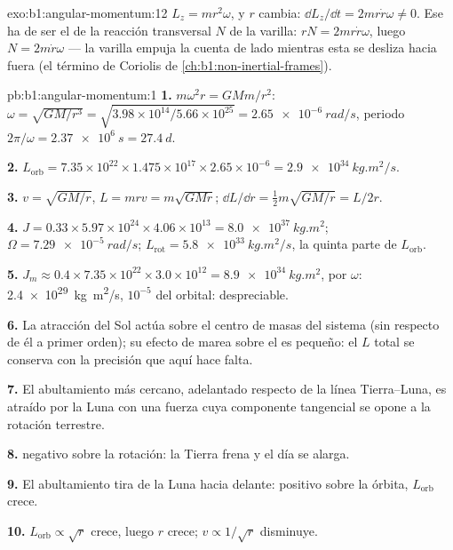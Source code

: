 \begin{solution}{exo:b1:angular-momentum:12}
$L_z = mr^2\omega$, y $r$ cambia: $\dd L_z/\dd t = 2mr\dot r\omega \neq 0$.
Ese ha de ser el  de la reacción transversal $N$ de la varilla: $rN =
2mr\dot r\omega$, luego $N = 2m\dot r\omega$ --- la varilla empuja la cuenta
de lado mientras esta se desliza hacia fuera (el término de Coriolis de
\cref{ch:b1:non-inertial-frames}).
\end{solution}

\begin{solution}{pb:b1:angular-momentum:1}
\textbf{1.} $m\omega^2r = GMm/r^2$: $\omega = \sqrt{GM/r^3} = \sqrt{3.98\times
10^{14}/5.66\times10^{25}} = \qty{2.65e-6}{rad/s}$, periodo $2\pi/\omega =
\qty{2.37e6}{s} = \qty{27.4}{d}$.

\textbf{2.} $L_{\text{orb}} = 7.35\times10^{22} \times 1.475\times10^{17}
\times 2.65\times10^{-6} = \qty{2.9e34}{kg.m^2/s}$.

\textbf{3.} $v = \sqrt{GM/r}$, $L = mrv = m\sqrt{GMr}$; $\dd L/\dd r =
\tfrac12 m\sqrt{GM/r} = L/2r$.

\textbf{4.} $J = 0.33 \times 5.97\times10^{24} \times 4.06\times10^{13} =
\qty{8.0e37}{kg.m^2}$; $\Omega = \qty{7.29e-5}{rad/s}$; $L_{\text{rot}} =
\qty{5.8e33}{kg.m^2/s}$, la quinta parte de $L_{\text{orb}}$.

\textbf{5.} $J_m \approx 0.4 \times 7.35\times10^{22} \times 3.0\times10^{12} =
\qty{8.9e34}{kg.m^2}$, por $\omega$: \qty{2.4e29}{kg.m^2/s}, $10^{-5}$ del
orbital: despreciable.

\textbf{6.} La atracción del Sol actúa sobre el centro de masas del
sistema (sin  respecto de él a primer orden); su efecto de marea
sobre el  es pequeño: el $L$ total se conserva con la precisión que
aquí hace falta.

\textbf{7.} El abultamiento más cercano, adelantado respecto de la línea
Tierra--Luna, es atraído por la Luna con una fuerza cuya componente
tangencial se opone a la rotación terrestre.

\textbf{8.}  negativo sobre la rotación: la Tierra frena y el día
se alarga.

\textbf{9.} El abultamiento tira de la Luna hacia delante: 
positivo sobre la órbita, $L_{\text{orb}}$ crece.

\textbf{10.} $L_{\text{orb}} \propto \sqrt r$ crece, luego $r$ crece; $v \propto
1/\sqrt r$ disminuye.


\end{solution}
